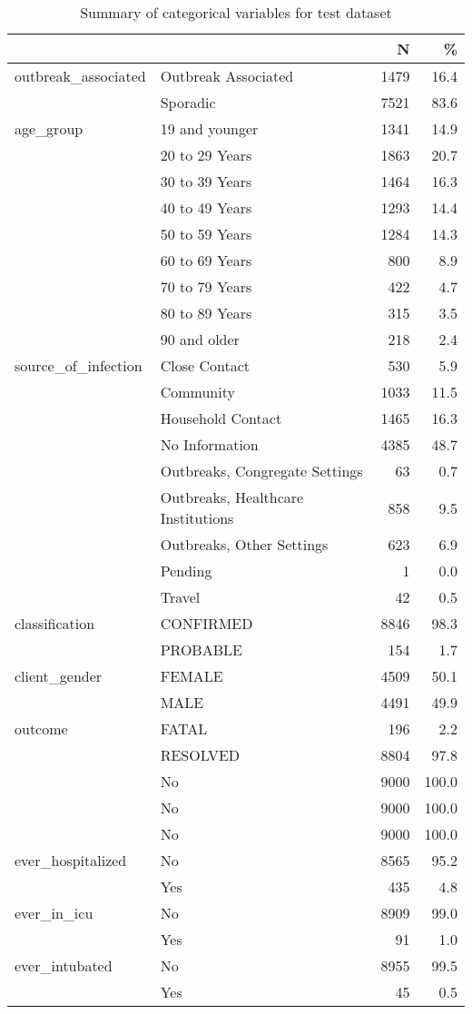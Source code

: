 \documentclass[
]{article}
\begin{document}
\begin{table}

\caption{\label{tab:testsummary}Summary of categorical variables for test dataset}
\centering
\begin{tabular}[t]{llrr}
\toprule
  &    & N & \%\\
\midrule
outbreak\_associated & Outbreak Associated & 1479 & \num{16.4}\\
 & Sporadic & 7521 & \num{83.6}\\
age\_group & 19 and younger & 1341 & \num{14.9}\\
 & 20 to 29 Years & 1863 & \num{20.7}\\
 & 30 to 39 Years & 1464 & \num{16.3}\\
 & 40 to 49 Years & 1293 & \num{14.4}\\
 & 50 to 59 Years & 1284 & \num{14.3}\\
 & 60 to 69 Years & 800 & \num{8.9}\\
 & 70 to 79 Years & 422 & \num{4.7}\\
 & 80 to 89 Years & 315 & \num{3.5}\\
 & 90 and older & 218 & \num{2.4}\\
source\_of\_infection & Close Contact & 530 & \num{5.9}\\
 & Community & 1033 & \num{11.5}\\
 & Household Contact & 1465 & \num{16.3}\\
 & No Information & 4385 & \num{48.7}\\
 & Outbreaks, Congregate Settings & 63 & \num{0.7}\\
 & Outbreaks, Healthcare Institutions & 858 & \num{9.5}\\
 & Outbreaks, Other Settings & 623 & \num{6.9}\\
 & Pending & 1 & \num{0.0}\\
 & Travel & 42 & \num{0.5}\\
classification & CONFIRMED & 8846 & \num{98.3}\\
 & PROBABLE & 154 & \num{1.7}\\
client\_gender & FEMALE & 4509 & \num{50.1}\\
 & MALE & 4491 & \num{49.9}\\
outcome & FATAL & 196 & \num{2.2}\\
 & RESOLVED & 8804 & \num{97.8}\\
 & No & 9000 & \num{100.0}\\
 & No & 9000 & \num{100.0}\\
 & No & 9000 & \num{100.0}\\
ever\_hospitalized & No & 8565 & \num{95.2}\\
 & Yes & 435 & \num{4.8}\\
ever\_in\_icu & No & 8909 & \num{99.0}\\
 & Yes & 91 & \num{1.0}\\
ever\_intubated & No & 8955 & \num{99.5}\\
 & Yes & 45 & \num{0.5}\\
\bottomrule
\end{tabular}
\end{table}
\end{document}
